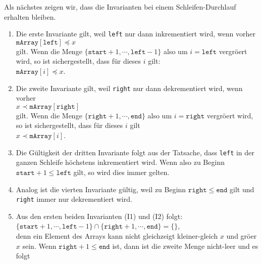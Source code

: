 \noindent
Als n\"achstes zeigen wir, dass die Invarianten bei einem Schleifen-Durchlauf erhalten
bleiben.  
\begin{enumerate}
\item Die erste Invariante gilt, weil \texttt{left} nur dann inkrementiert wird,
      wenn vorher \\[0.1cm]
      \hspace*{1.3cm} $\texttt{mArray}[\texttt{left}] \preceq x$ \\[0.1cm]
      gilt.  Wenn die Menge $\{\mathtt{start}+1, \cdots, \mathtt{left}-1\}$ also um 
      $i = \mathtt{left}$ vergr\"o\3ert wird, so ist sichergestellt, dass f\"ur dieses $i$ gilt:
      \\[0.1cm]
      \hspace*{1.3cm} $\texttt{mArray}[i] \preceq x$.
\item Die zweite Invariante gilt, weil \texttt{right} nur dann dekrementiert wird,
      wenn vorher \\[0.1cm]
      \hspace*{1.3cm} $x \prec \texttt{mArray}[\texttt{right}]$ \\[0.1cm]
      gilt.  Wenn die Menge $\{\mathtt{right}+1, \cdots, \mathtt{end}\}$ also um 
      $i = \mathtt{right}$ vergr\"o\3ert wird, so ist sichergestellt, dass f\"ur dieses $i$ gilt
      \\[0.1cm]
      \hspace*{1.3cm} $x \prec \texttt{mArray}[i]$.
\item Die G\"ultigkeit der dritten Invariante folgt aus der Tatsache, dass \texttt{left}
      in der ganzen Schleife h\"ochstens inkrementiert wird.  Wenn also zu Beginn 
      $\mathtt{start} + 1 \leq \mathtt{left}$ gilt, so wird dies immer gelten.  
\item Analog ist die vierten Invariante g\"ultig, weil zu Beginn $\mathtt{right} \leq \mathtt{end}$ gilt und
      \texttt{right} immer nur dekrementiert wird.
\item Aus den ersten beiden Invarianten (I1) und (I2) folgt: \\[0.1cm]
      \hspace*{1.3cm} 
      $\{ \mathtt{start}+1, \cdots, \mathtt{left} - 1 \} \cap \{ \mathtt{right}+1, \cdots, \mathtt{end} \} = \{\}$,
      \\[0.1cm]
      denn ein Element des Arrays kann nicht gleichzeigt kleiner-gleich $x$ und 
      gr\"o\3er $x$ sein.
      Wenn $\texttt{right} + 1 \leq \texttt{end}$ ist, dann ist die zweite Menge
      nicht-leer und es folgt \\[0.1cm]

\end{enumerate}
